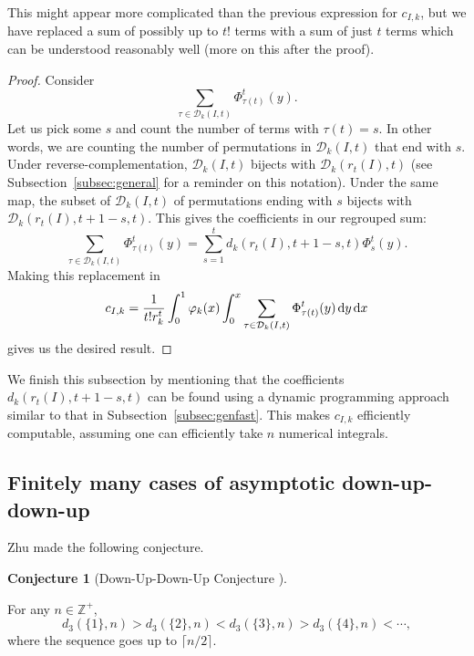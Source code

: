 \documentclass{amsart}
\theoremstyle{definition}
\newtheorem{conjecture}[theorem]{Conjecture}
\begin{document}
This might appear more complicated than the previous expression for $c_{I,k}$, but we have replaced a sum of possibly up to $t!$ terms with a sum of just $t$ terms which can be understood reasonably well (more on this after the proof).

\begin{proof}
Consider
\[\sum_{\tau\in \mathcal{D}_k(I,t)}\Phi_{\tau(t)}^t(y).\]
Let us pick some $s$ and count the number of terms with $\tau(t)=s$. In other words, we are counting the number of permutations in $\mathcal{D}_k(I,t)$ that end with $s$. Under reverse-complementation, $\mathcal{D}_k(I,t)$ bijects with $\mathcal{D}_k(r_t(I),t)$ (see Subsection~\ref{subsec:general} for a reminder on this notation). Under the same map, the subset of $\mathcal{D}_k(I,t)$ of permutations ending with $s$ bijects with $\mathcal{D}_k(r_t(I),t+1-s,t)$. This gives the coefficients in our regrouped sum:
\[\sum_{\tau\in \mathcal{D}_k(I,t)}\Phi_{\tau(t)}^t(y)=\sum_{s=1}^t d_k(r_t(I),t+1-s,t)\Phi_{s}^t(y).\]
Making this replacement in 
\[c_{I,k}=\frac{1}{t! r_k^t}\int_0^1\varphi_k(x)\int_{0}^{x}\sum_{\tau\in \mathcal{D}_k(I,t)}\Phi_{\tau(t)}^t(y)\hspace{0.5mm}\mathrm{d}y\hspace{0.5mm}\mathrm{d}x\]
gives us the desired result.
\end{proof}

We finish this subsection by mentioning that the coefficients $d_k(r_t(I),t+1-s,t)$ can be found using a dynamic programming approach similar to that in Subsection~\ref{subsec:genfast}. This makes $c_{I,k}$ efficiently computable, assuming one can efficiently take $n$ numerical integrals.


\subsection{Finitely many cases of asymptotic down-up-down-up}

Zhu \cite{zhu2019enumerating} made the following conjecture.

\begin{conjecture}[Down-Up-Down-Up Conjecture \cite{zhu2019enumerating}]\label{conj:dudu}

For any $n\in \mathbb{Z}^+$, 
\[d_3(\{1\},n)>d_3(\{2\},n)<d_3(\{3\},n)>d_3(\{4\},n)<\cdots,\]
where the sequence goes up to $\lceil n/2\rceil$.
\end{conjecture}
\end{document}
